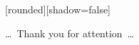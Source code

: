 
{
  [rounded][shadow=false]

  \begin{frame}[plain]
    \begin{block}{}
      \begin{center}
        \ldots~Thank you for attention~\ldots
      \end{center}
    \end{block}
  \end{frame}
}